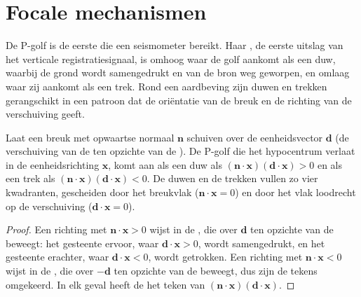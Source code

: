 \section{Focale mechanismen}\label{sec:b1:earthquake-source:focal}

De P-golf is de eerste die een seismometer bereikt. Haar , de eerste uitslag van het verticale registratiesignaal, is omhoog waar de golf aankomt als een duw, waarbij de grond wordt samengedrukt en van de bron weg geworpen, en omlaag waar zij aankomt als een trek. Rond een aardbeving zijn duwen en trekken gerangschikt in een patroon dat de oriëntatie van de breuk en de richting van de verschuiving geeft.

\begin{proposition}\label{prop:b1:earthquake-source:first-motion}
Laat een breuk met opwaartse normaal $\mathbf n$ schuiven over de eenheidsvector $\mathbf d$ (de verschuiving van de  ten opzichte van de ). De P-golf die het hypocentrum verlaat in de eenheidsrichting $\mathbf x$, komt aan als een duw als $(\mathbf n\cdot\mathbf x)(\mathbf d\cdot\mathbf x) > 0$ en als een trek als $(\mathbf n\cdot\mathbf x)(\mathbf d\cdot\mathbf x) < 0$. De duwen en de trekken vullen zo vier kwadranten, gescheiden door het breukvlak ($\mathbf n\cdot\mathbf x = 0$) en door het vlak loodrecht op de verschuiving ($\mathbf d\cdot\mathbf x = 0$).
\end{proposition}

\begin{proof}
Een richting met $\mathbf n\cdot\mathbf x > 0$ wijst in de , die over $\mathbf d$ ten opzichte van de  beweegt: het gesteente ervoor, waar $\mathbf d\cdot\mathbf x > 0$, wordt samengedrukt, en het gesteente erachter, waar $\mathbf d\cdot\mathbf x < 0$, wordt getrokken. Een richting met $\mathbf n\cdot\mathbf x < 0$ wijst in de , die over $-\mathbf d$ ten opzichte van de  beweegt, dus zijn de tekens omgekeerd. In elk geval heeft de  het teken van $(\mathbf n\cdot\mathbf x)(\mathbf
d\cdot\mathbf x)$.
\end{proof}

